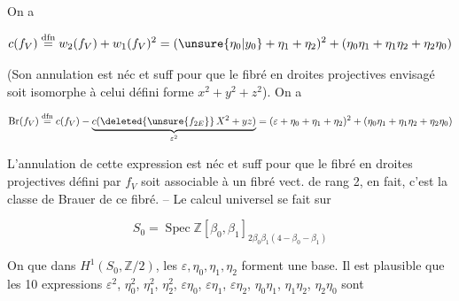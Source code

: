 
On a

\[c(f_V)\overset{\mathrm{dfn}}=w_2(f_V)+w_1(f_V)^2=(\unsure{\eta_0|y_0}+\eta_1+\eta_2)^2+(\eta_0\eta_1+\eta_1\eta_2+\eta_2\eta_0)\]

(Son annulation est néc et suff pour que le fibré en droites projectives envisagé soit isomorphe à celui défini   forme $x^2+y^2+z^2$). On a

\[\operatorname{Br}(f_V)\overset{\mathrm{dfn}}=c(f_V)-\underbrace{c(\deleted{\unsure{f_{2E}}}\,X^2+yz)}_{\varepsilon^2}=(\varepsilon+\eta_0+\eta_1+\eta_2)^2+(\eta_0\eta_1+\eta_1\eta_2+\eta_2\eta_0)\]

L'annulation de cette expression est néc et suff pour que le fibré en droites projectives  défini par $f_V$ soit associable à un fibré vect. de rang 2, en fait, c'est la classe de Brauer de ce fibré. -- Le calcul universel se fait sur

\[S_0=\operatorname{Spec}\mathbb Z[\beta_0,\beta_1]_{2\beta_0\beta_1(4-\beta_0-\beta_1)}\]

On  que dans $H^1(S_0,\mathbb Z/2)$, les   $\varepsilon,\eta_0,\eta_1,\eta_2$ forment une base. Il est plausible que les 10 expressions $\varepsilon^2$, $\eta_0^2$, $\eta_1^2$, $\eta_2^2$, $\varepsilon \eta_0$, $\varepsilon \eta_1$, $\varepsilon \eta_2$, $\eta_0\eta_1$, $\eta_1\eta_2$, $\eta_2\eta_0$ sont

